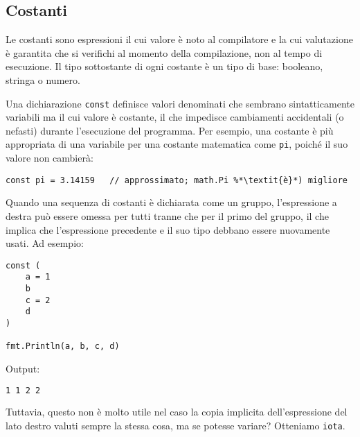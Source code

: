 \documentclass[../../thesis.tex]{subfiles}
\begin{document}
    \subsection{Costanti}\label{subsec:costanti}
    Le costanti sono espressioni il cui valore è noto al compilatore e la cui valutazione è garantita che si verifichi al momento della compilazione, non al tempo di esecuzione.
    Il tipo sottostante di ogni costante è un tipo di base: booleano, stringa o numero.
    \hfill \vspace{12pt}

    Una dichiarazione \verb"const" definisce valori denominati che sembrano sintatticamente variabili ma il cui valore è costante, il che impedisce cambiamenti accidentali (o nefasti) durante l'esecuzione del programma.
    Per esempio, una costante è più appropriata di una variabile per una costante matematica come \verb"pi", poiché il suo valore non cambierà:
    \begin{lstlisting}[frame = single,label={lst:lstlisting2-3.1}]
const pi = 3.14159   // approssimato; math.Pi %*\textit{è}*) migliore
    \end{lstlisting}
    Quando una sequenza di costanti è dichiarata come un gruppo, l'espressione a destra può essere omessa per tutti tranne che per il primo del gruppo, il che implica che l'espressione precedente e il suo tipo debbano essere nuovamente usati.
    Ad esempio:
    \begin{lstlisting}[frame = single,label={lst:lstlisting2-3.2}]
const (
    a = 1
    b
    c = 2
    d
)

fmt.Println(a, b, c, d)
    \end{lstlisting}
    Output:
    \begin{lstlisting}[language = bash, frame = L,label={lst:lstlisting2-3.3}]
1 1 2 2
    \end{lstlisting}
    Tuttavia, questo non è molto utile nel caso la copia implicita dell'espressione del lato destro valuti sempre la stessa cosa, ma se potesse variare?
    Otteniamo \verb"iota".
    
\end{document}
